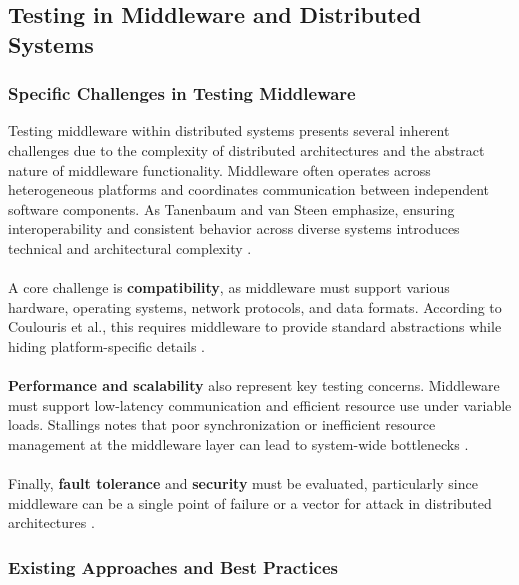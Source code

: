 \subsection{Testing in Middleware and Distributed Systems}

\subsubsection{Specific Challenges in Testing Middleware}

Testing middleware within distributed systems presents several inherent challenges due to the complexity of distributed architectures and the abstract nature of middleware functionality. Middleware often operates across heterogeneous platforms and coordinates communication between independent software components. As Tanenbaum and van Steen emphasize, ensuring interoperability and consistent behavior across diverse systems introduces technical and architectural complexity \cite{tanenbaum2017}.
\\
\\
A core challenge is \textbf{compatibility}, as middleware must support various hardware, operating systems, network protocols, and data formats. According to Coulouris et al., this requires middleware to provide standard abstractions while hiding platform-specific details \cite{coulouris2012}. 
\\
\\
\textbf{Performance and scalability} also represent key testing concerns. Middleware must support low-latency communication and efficient resource use under variable loads. Stallings notes that poor synchronization or inefficient resource management at the middleware layer can lead to system-wide bottlenecks \cite{stallings2018}.
\\
\\
Finally, \textbf{fault tolerance} and \textbf{security} must be evaluated, particularly since middleware can be a single point of failure or a vector for attack in distributed architectures \cite{liu2009middleware}.

\subsubsection{Existing Approaches and Best Practices}

